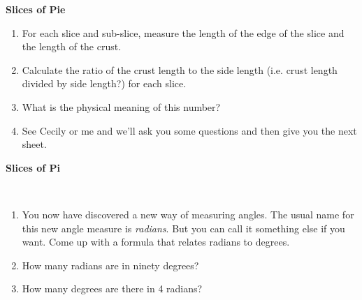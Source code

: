 \documentclass[12pt]{article}
\begin{document}
\pagestyle{empty}


\begin{center}
{\bf {\Large Slices of Pie}}\\
\end{center}

\begin{enumerate}
\setlength{\itemsep}{0mm}
\item For each slice and sub-slice, measure the length of the edge of
the slice and the length of the crust.

\item Calculate the ratio of the crust length to the side length
(i.e. crust length divided by side length?) for each slice.

\item What is the physical meaning of this number?  

\item See Cecily or me and we'll ask you some questions and then give
  you the next sheet.

\end{enumerate}

 
\begin{figure}[hbp]
\epsfxsize=6.5in
\begin{center}
\leavevmode
{}
\end{center}
\vspace{2mm}
\end{figure}

\newpage


\begin{center}
{\bf {\Large Slices of Pi}}\\
\end{center}

\hspace{2mm}\\

\begin{enumerate}

\item You now have discovered a new way of measuring angles.  The
  usual name for this new angle measure is {\em radians}.  But you can
  call it something else if you want.  Come up with a formula that
  relates radians to degrees.

\item How many radians are in ninety degrees?

\item How many degrees are there in 4 radians?


\end{enumerate}
\end{document}
